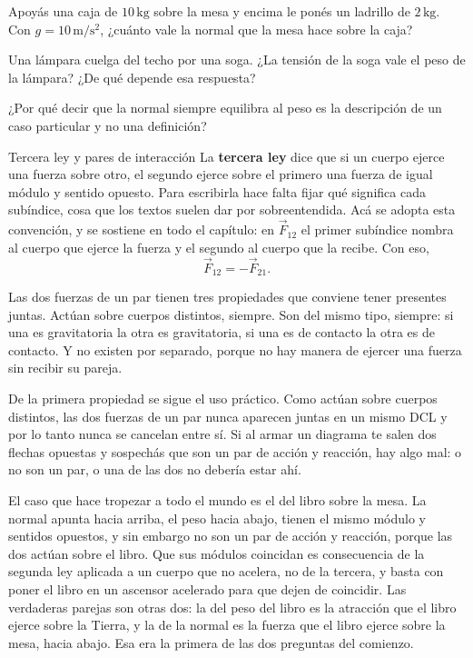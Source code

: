 \documentclass[11pt,openany]{book}
\begin{document}
\begin{chequeo}
\item Apoyás una caja de $10\,\mathrm{kg}$ sobre la mesa y encima le ponés un ladrillo de $2\,\mathrm{kg}$. Con $g = 10\,\mathrm{m/s^2}$, ¿cuánto vale la normal que la mesa hace sobre la caja?
\item Una lámpara cuelga del techo por una soga. ¿La tensión de la soga vale el peso de la lámpara? ¿De qué depende esa respuesta?
\item ¿Por qué decir que la normal siempre equilibra al peso es la descripción de un caso particular y no una definición?
\end{chequeo}

\begin{bloque}{Tercera ley y pares de interacción}
La \textbf{tercera ley} dice que si un cuerpo ejerce una fuerza sobre otro, el segundo ejerce sobre el primero una fuerza de igual módulo y sentido opuesto. Para escribirla hace falta fijar qué significa cada subíndice, cosa que los textos suelen dar por sobreentendida. Acá se adopta esta convención, y se sostiene en todo el capítulo: en $\vec F_{12}$ el primer subíndice nombra al cuerpo que ejerce la fuerza y el segundo al cuerpo que la recibe. Con eso,
\[
\vec F_{12} = -\vec F_{21}.
\]

Las dos fuerzas de un par tienen tres propiedades que conviene tener presentes juntas. Actúan sobre cuerpos distintos, siempre. Son del mismo tipo, siempre: si una es gravitatoria la otra es gravitatoria, si una es de contacto la otra es de contacto. Y no existen por separado, porque no hay manera de ejercer una fuerza sin recibir su pareja.

De la primera propiedad se sigue el uso práctico. Como actúan sobre cuerpos distintos, las dos fuerzas de un par nunca aparecen juntas en un mismo DCL y por lo tanto nunca se cancelan entre sí. Si al armar un diagrama te salen dos flechas opuestas y sospechás que son un par de acción y reacción, hay algo mal: o no son un par, o una de las dos no debería estar ahí.

El caso que hace tropezar a todo el mundo es el del libro sobre la mesa. La normal apunta hacia arriba, el peso hacia abajo, tienen el mismo módulo y sentidos opuestos, y sin embargo no son un par de acción y reacción, porque las dos actúan sobre el libro. Que sus módulos coincidan es consecuencia de la segunda ley aplicada a un cuerpo que no acelera, no de la tercera, y basta con poner el libro en un ascensor acelerado para que dejen de coincidir. Las verdaderas parejas son otras dos: la del peso del libro es la atracción que el libro ejerce sobre la Tierra, y la de la normal es la fuerza que el libro ejerce sobre la mesa, hacia abajo. Esa era la primera de las dos preguntas del comienzo.


\end{bloque}
\end{document}
